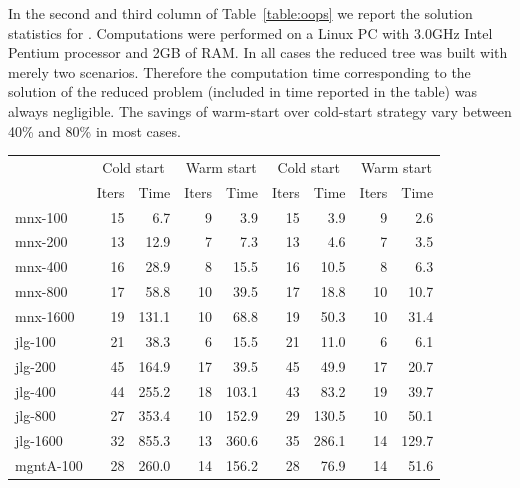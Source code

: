 In the second and third column of Table~\ref{table:oops} 
we report the solution statistics for \OOPS.
Computations were performed on a Linux PC with 3.0GHz Intel Pentium
processor and 2GB of RAM.
In all cases the reduced tree was built with merely two scenarios.
Therefore the computation time corresponding to the solution 
of the reduced problem (included in time reported in the table) 
was always negligible. The savings of warm-start over cold-start 
strategy vary between 40\% and 80\% in most cases.
%
\setlength{\tabcolsep}{6pt}
\begin{table}[ht]
  \begin{center}
    \begin{tabular}{|l||rr|rr||rr|rr|} \hline
     \multicolumn{1}{|c||}{\raisebox{-1ex}{Problem}} &
     \multicolumn{2}{c|}{Cold start} &
     \multicolumn{2}{c||}{Warm start} &
     \multicolumn{2}{c|}{Cold start} &
     \multicolumn{2}{c|}{Warm start}\\
              &Iters &   Time &Iters &   Time & Iters &   Time & Iters &   Time  \\ \hline\hline
mnx-100       &   15 &    6.7 &    9 &    3.9 &  15 &    3.9 &   9 &    2.6 \\
mnx-200       &   13 &   12.9 &    7 &    7.3 &  13 &    4.6 &   7 &    3.5 \\
mnx-400       &   16 &   28.9 &    8 &   15.5 &  16 &   10.5 &   8 &    6.3 \\
mnx-800       &   17 &   58.8 &   10 &   39.5 &  17 &   18.8 &  10 &   10.7 \\
mnx-1600      &   19 &  131.1 &   10 &   68.8 &  19 &   50.3 &  10 &   31.4 \\
\hline
jlg-100       &   21 &   38.3 &    6 &   15.5 &  21 &   11.0 &   6 &    6.1 \\
jlg-200       &   45 &  164.9 &   17 &   39.5 &  45 &   49.9 &  17 &   20.7 \\
jlg-400       &   44 &  255.2 &   18 &  103.1 &  43 &   83.2 &  19 &   39.7 \\ %
jlg-800       &   27 &  353.4 &   10 &  152.9 &  29 &  130.5 &  10 &   50.1 \\ %
jlg-1600      &   32 &  855.3 &   13 &  360.6 &  35 &  286.1 &  14 &  129.7 \\ %
\hline
mgntA-100     &   28 &  260.0 &   14 &  156.2 &  28 &   76.9 &  14 &   51.6 \\

\end{tabular}
\end{center}
\end{table}
